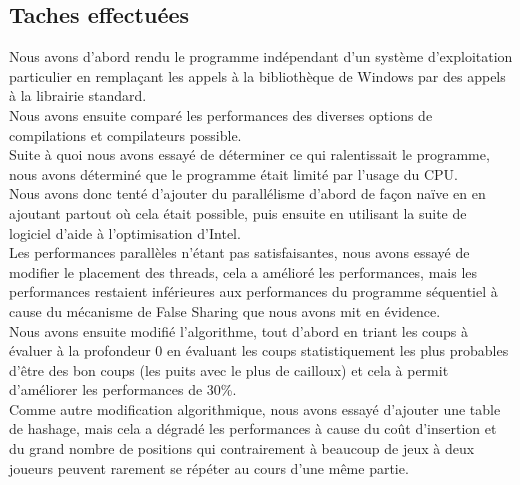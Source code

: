\documentclass[
 aip,
 jmp,
 amsmath,amssymb,
 reprint
]{revtex4-1}
\begin{document}
\subsection{Taches effectuées}
Nous avons d'abord rendu le programme indépendant d'un système d'exploitation particulier en remplaçant les appels à la  bibliothèque de Windows par des appels à la librairie standard.\\
Nous avons ensuite comparé les performances des diverses options de compilations et compilateurs possible.\\
Suite à quoi nous avons essayé de déterminer ce qui ralentissait le programme, nous avons déterminé que le programme était limité par l'usage du CPU.\\
Nous avons donc tenté d'ajouter du parallélisme d'abord de façon naïve en en ajoutant partout où cela était possible, puis ensuite en utilisant la suite de logiciel d'aide à l'optimisation d'Intel.\\
Les performances parallèles n'étant pas satisfaisantes, nous avons essayé de modifier le placement des threads, cela a amélioré les performances, mais les performances restaient inférieures aux performances du programme séquentiel à cause du mécanisme de False Sharing que nous avons mit en évidence.\\
Nous avons ensuite modifié l'algorithme, tout d'abord en triant les coups à évaluer à la profondeur 0 en évaluant les coups statistiquement les plus probables d'être des bon coups (les puits avec le plus de cailloux) et cela à permit d'améliorer les performances de 30\%.\\
Comme autre modification algorithmique, nous avons essayé d'ajouter une table de hashage, mais cela a dégradé les performances à cause du coût d'insertion et du grand nombre de positions qui contrairement à beaucoup de jeux à deux joueurs peuvent rarement se répéter au cours d'une même partie.
\end{document}
